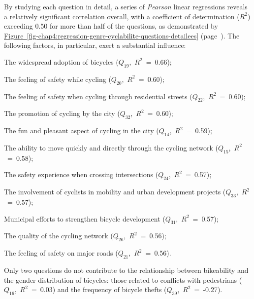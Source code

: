 \begin{refsegment}
By studying each question in detail, a series of \textsl{Pearson} linear regressions \textcolor{blue}{\autocite{pearson_vii_1896}} reveals a relatively significant correlation overall, with a coefficient of determination ($R^2$) exceeding 0.50 for more than half of the questions, as demonstrated by \hyperref[fig-chap4:regression-genre-cyclabilite-questions-detailees]{Figure~\ref{fig-chap4:regression-genre-cyclabilite-questions-detailees}} (page~\pageref{fig-chap4:regression-genre-cyclabilite-questions-detailees}). The following factors, in particular, exert a substantial influence:
    \begin{customitemize}
\item The widespread adoption of bicycles (\(Q_{19}\),~$R^2$~=~0.66);
\item The feeling of safety while cycling (\(Q_{20}\),~$R^2$~=~0.60);
\item The feeling of safety when cycling through residential streets (\(Q_{22}\),~$R^2$~=~0.60);
\item The promotion of cycling by the city (\(Q_{32}\),~$R^2$~=~0.60);
\item The fun and pleasant aspect of cycling in the city (\(Q_{14}\),~$R^2$~=~0.59);
\item The ability to move quickly and directly through the cycling network (\(Q_{15}\),~$R^2$~=~0.58);
\item The safety experience when crossing intersections (\(Q_{24}\),~$R^2$~=~0.57);
\item The involvement of cyclists in mobility and urban development projects (\(Q_{33}\),~$R^2$~=~0.57);
\item Municipal efforts to strengthen bicycle development (\(Q_{31}\),~$R^2$~=~0.57);
\item The quality of the cycling network (\(Q_{26}\),~$R^2$~=~0.56);
\item The feeling of safety on major roads (\(Q_{21}\),~$R^2$~=~0.56).
    \end{customitemize}
Only two questions do not contribute to the relationship between bikeability and the gender distribution of bicycles: those related to conflicts with pedestrians (\(Q_{16}\),~$R^2$~=~0.03) and the frequency of bicycle thefts (\(Q_{39}\),~$R^2$~=~-0.27).%


\end{refsegment}
